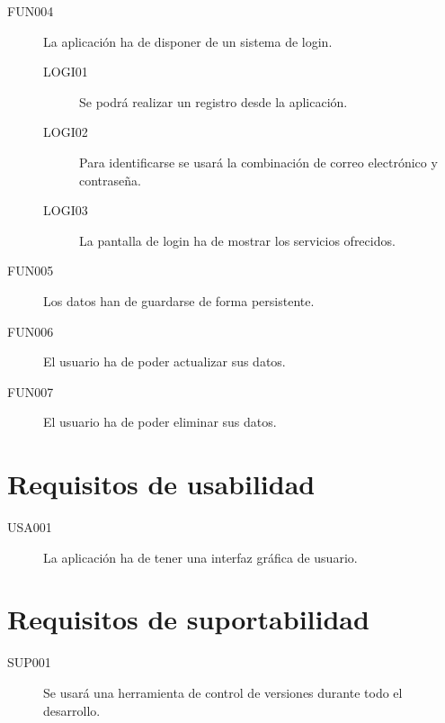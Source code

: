 \begin{description}
      \item[FUN004] La aplicación ha de disponer de un sistema de login.
      \begin{description}
	\item[LOGI01] Se podrá realizar un registro desde la aplicación.
	\item[LOGI02] Para identificarse se usará la combinación de correo electrónico y contraseña.
	\item[LOGI03] La pantalla de login ha de mostrar los servicios ofrecidos.
      \end{description}

      \item[FUN005] Los datos han de guardarse de forma persistente.

      \item[FUN006] El usuario ha de poder actualizar sus datos.
      \item[FUN007] El usuario ha de poder eliminar sus datos.
    \end{description}


  \section{Requisitos de usabilidad}
    \begin{description}
      \item[USA001] La aplicación ha de tener una interfaz gráfica de usuario.
    \end{description}





  \section{Requisitos de suportabilidad}
    \begin{description}
      \item[SUP001] Se usará una herramienta de control de versiones durante todo el desarrollo.
    \end{description}
